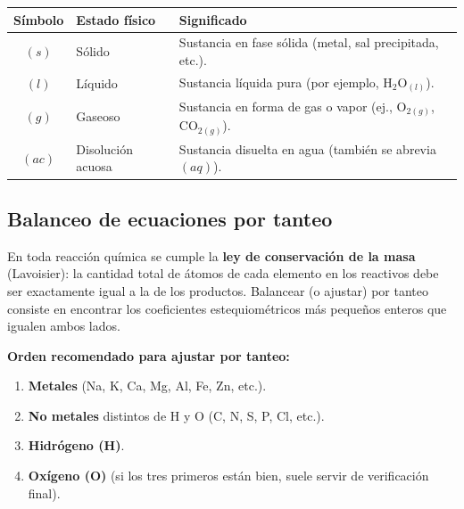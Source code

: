 \documentclass[12pt, letterpaper]{article}
\begin{document}
\begin{center}
  \small
  \setlength{\tabcolsep}{10pt}
  \begin{tabular}{cll}
    \toprule
    \textbf{Símbolo} & \textbf{Estado físico} & \textbf{Significado} \\
    \midrule
    $(s)$  & Sólido            & Sustancia en fase sólida (metal, sal precipitada, etc.). \\
    $(l)$  & Líquido           & Sustancia líquida pura (por ejemplo, $\text{H}_2\text{O}_{(l)}$). \\
    $(g)$  & Gaseoso           & Sustancia en forma de gas o vapor (ej., $\text{O}_{2(g)}$, $\text{CO}_{2(g)}$). \\
    $(ac)$ & Disolución acuosa & Sustancia disuelta en agua (también se abrevia $(aq)$). \\
    \bottomrule
  \end{tabular}
\end{center}

\subsection{Balanceo de ecuaciones por tanteo}

\begin{cuadroteoria}[nobreak=true]
  En toda reacción química se cumple la \textbf{ley de conservación de la masa} (Lavoisier): la cantidad total de átomos de cada elemento en los reactivos debe ser exactamente igual a la de los productos. Balancear (o ajustar) por tanteo consiste en encontrar los coeficientes estequiométricos más pequeños enteros que igualen ambos lados.
\end{cuadroteoria}

\begin{cuadropasos}[nobreak=true]
  \textbf{Orden recomendado para ajustar por tanteo:}
  \begin{enumerate}[leftmargin=*, nosep, topsep=3pt]
    \item \textbf{Metales} (Na, K, Ca, Mg, Al, Fe, Zn, etc.).
    \item \textbf{No metales} distintos de H y O (C, N, S, P, Cl, etc.).
    \item \textbf{Hidrógeno (H)}.
    \item \textbf{Oxígeno (O)} (si los tres primeros están bien, suele servir de verificación final).
  \end{enumerate}
\end{cuadropasos}
\end{document}
